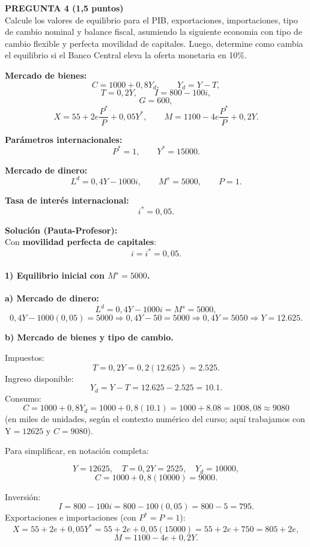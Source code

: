 \documentclass[11pt,addpoints]{article}
\begin{document}
\newpage
\vspace*{0.5cm}
\textbf{PREGUNTA 4 (1,5 puntos)}\\[0.2cm]
Calcule los valores de equilibrio para el PIB, exportaciones, importaciones, tipo de cambio nominal y balance fiscal, asumiendo la siguiente economia con tipo de cambio flexible y perfecta movilidad de capitales. Luego, determine como cambia el equilibrio si el Banco Central eleva la oferta monetaria en 10\%.

\medskip
\textbf{Mercado de bienes:}
\[
C = 1000 + 0{,}8Y_d, \qquad Y_d = Y - T,
\]
\[
T = 0{,}2Y, \qquad I = 800 - 100i,
\]
\[
G = 600,
\]
\[
X = 55 + 2e\frac{P^*}{P} + 0{,}05Y^*, \qquad
M = 1100 - 4e\frac{P^*}{P} + 0{,}2Y.
\]

\textbf{Parámetros internacionales:}
\[
P^* = 1, \qquad Y^* = 15000.
\]

\textbf{Mercado de dinero:}
\[
L^d = 0{,}4Y - 1000i, \qquad M^s = 5000, \qquad P = 1.
\]

\textbf{Tasa de interés internacional:}
\[
i^* = 0{,}05.
\]

\vspace{0.2cm}
\textbf{Solución (Pauta-Profesor):}\\[0.1cm]

Con \textbf{movilidad perfecta de capitales}:
\[
i = i^* = 0{,}05.
\]

\paragraph{1) Equilibrio inicial con $M^s = 5000$.}

\textbf{a) Mercado de dinero:}
\[
L^d = 0{,}4Y - 1000i = M^s=5000,
\]
\[
0{,}4Y - 1000(0{,}05) = 5000 \Rightarrow 0{,}4Y - 50 = 5000
\Rightarrow 0{,}4Y = 5050 \Rightarrow Y = 12{.}625.
\]


\textbf{b) Mercado de bienes y tipo de cambio.}

Impuestos:
\[
T = 0{,}2Y = 0{,}2(12{.}625) = 2{.}525.
\]
Ingreso disponible:
\[
Y_d = Y - T = 12{.}625 - 2{.}525 = 10{.}1.
\]
Consumo:
\[
C = 1000 + 0{,}8Y_d = 1000 + 0{,}8(10{.}1) = 1000 + 8{.}08 = 1008{,}08 \approx 9080 
\]
(en miles de unidades, según el contexto numérico del curso; aquí trabajamos con $\text{Y}=12625$ y $C=9080$).

Para simplificar, en notación completa:

\[
Y = 12625,\quad T = 0{,}2Y = 2525,\quad Y_d = 10000,
\]
\[
C = 1000 + 0{,}8(10000) = 9000.
\]

Inversión:
\[
I = 800 - 100i = 800 - 100(0{,}05) = 800 - 5 = 795.
\]
\newpage
\vspace*{0.5cm}
Exportaciones e importaciones (con $P^* = P = 1$):
\[
X = 55 + 2e + 0{,}05Y^* = 55 + 2e + 0{,}05(15000) = 55 + 2e + 750 = 805 + 2e,
\]
\[
M = 1100 - 4e + 0{,}2Y.
\]
\end{document}

